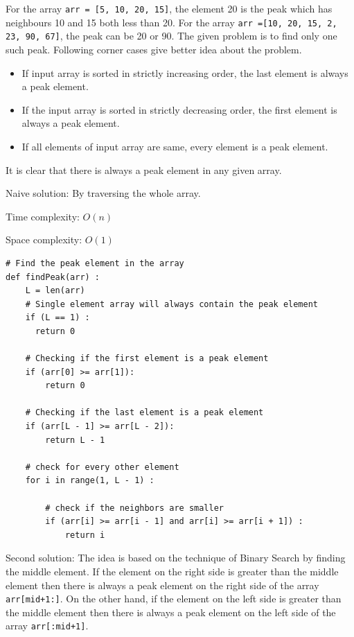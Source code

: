 \documentclass[a4paper,11pt]{book}
\begin{document}
\noindent For the array \lstinline{arr = [5, 10, 20, 15]}, the element 20 is the peak which has neighbours 10 and 15 both less than 20. For the array \lstinline{arr =[10, 20, 15, 2, 23, 90, 67]}, the peak can be 20 or 90. The given problem is to find only one such peak. Following corner cases give better idea about the problem. 

\begin{itemize}
    \item If input array is sorted in strictly increasing order, the last element is always a peak element.
    \item If the input array is sorted in strictly decreasing order, the first element is always a peak element.
    \item If all elements of input array are same, every element is a peak element.
\end{itemize}
It is clear that there is always a peak element in any given array.

\vspace{3mm}

\noindent Naive solution: By traversing the whole array.

\noindent Time complexity: $O(n)$

\noindent Space complexity: $O(1)$

\begin{lstlisting}
# Find the peak element in the array
def findPeak(arr) :
    L = len(arr)
    # Single element array will always contain the peak element
    if (L == 1) :
      return 0

    # Checking if the first element is a peak element
    if (arr[0] >= arr[1]):
        return 0

    # Checking if the last element is a peak element
    if (arr[L - 1] >= arr[L - 2]):
        return L - 1
  
    # check for every other element
    for i in range(1, L - 1) :
  
        # check if the neighbors are smaller
        if (arr[i] >= arr[i - 1] and arr[i] >= arr[i + 1]) :
            return i
\end{lstlisting}

\noindent Second solution: The idea is based on the technique of Binary Search by finding the middle element. If the element on the right side is greater than the middle element then there is always a peak element on the right side of the array \lstinline{arr[mid+1:]}. On the other hand, if the element on the left side is greater than the middle element then there is always a peak element on the left side of the array \lstinline{arr[:mid+1]}.
\vspace{3mm}
\end{document}
